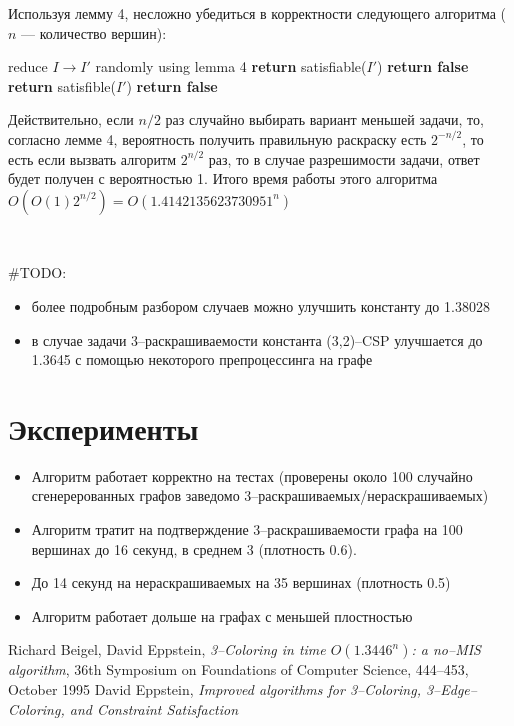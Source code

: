 \documentclass[fleqn]{article}
\theoremstyle{plain}
\theoremstyle{plain}
\theoremstyle{plain}
\theoremstyle{definition}
\begin{document}
Используя лемму 4, несложно убедиться в корректности следующего алгоритма ($n$ --- количество вершин):
\begin{algorithm}[H]
  \begin{algorithmic}[1]
				\State reduce $I \rightarrow I'$ randomly using lemma 4
				\State \textbf{return} satisfiable($I'$)
				\State \textbf{return false}
			\Else
				\State \textbf{return} satisfible($I'$)
			\EndIf
    	\EndFor
    	\State \textbf{return false}
    \EndFunction
  \end{algorithmic}
\end{algorithm}

Действительно, если $n/2$ раз случайно выбирать вариант меньшей задачи, то, согласно лемме 4, вероятность получить правильную раскраску есть $2^{-n/2}$, то есть если вызвать алгоритм $2^{n/2}$ раз, то в случае разрешимости задачи, ответ будет получен с вероятностью 1. Итого время работы этого алгоритма $O(O(1)2^{n/2}) = O(1.4142135623730951^n)$


\

\#TODO: 
\begin{itemize}
	\item более подробным разбором случаев можно улучшить константу до 1.38028
	\item в случае задачи 3--раскрашиваемости константа (3,2)--CSP улучшается до 1.3645 с помощью некоторого препроцессинга на графе
\end{itemize} 

\section{Эксперименты}
\begin{itemize}
	\item Алгоритм работает корректно на тестах (проверены около 100 случайно сгенерерованных графов заведомо 3--раскрашиваемых/нераскрашиваемых)
	\item Алгоритм тратит на подтверждение 3--раскрашиваемости графа на 100 вершинах до 16 секунд, в среднем 3 (плотность 0.6).
	\item До 14 секунд на нераскрашиваемых на 35 вершинах (плотность 0.5)
	\item Алгоритм работает дольше на графах с меньшей плостностью
\end{itemize}
\begin{thebibliography}{}
     Richard Beigel, David Eppstein, \emph{3--Coloring in time $O(1.3446^n)$: a no--MIS algorithm}, 36th Symposium on Foundations of Computer Science, 444--453, October 1995
     David Eppstein, \emph{Improved algorithms for 3--Coloring, 3--Edge--Coloring, and Constraint Satisfaction} 
\end{thebibliography}
\end{document}
